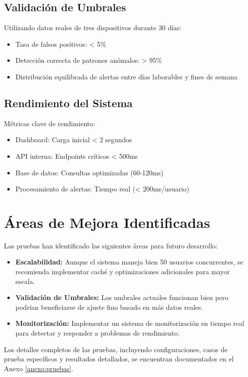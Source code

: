 \subsection{Validación de Umbrales}
Utilizando datos reales de tres dispositivos durante 30 días:
\begin{itemize}
    \item Tasa de falsos positivos: < 5\%
    \item Detección correcta de patrones anómalos: > 95\%
    \item Distribución equilibrada de alertas entre días laborables y fines de semana
\end{itemize}

\subsection{Rendimiento del Sistema}
Métricas clave de rendimiento:
\begin{itemize}
    \item Dashboard: Carga inicial < 2 segundos
    \item API interna: Endpoints críticos < 500ms
    \item Base de datos: Consultas optimizadas (60-120ms)
    \item Procesamiento de alertas: Tiempo real (< 200ms/usuario)
\end{itemize}

\section{Áreas de Mejora Identificadas}
\label{sec:areas_mejora}

Las pruebas han identificado las siguientes áreas para futuro desarrollo:

\begin{itemize}
    \item \textbf{Escalabilidad:} Aunque el sistema maneja bien 50 usuarios concurrentes, se recomienda implementar caché y optimizaciones adicionales para mayor escala.
    \item \textbf{Validación de Umbrales:} Los umbrales actuales funcionan bien pero podrían beneficiarse de ajuste fino basado en más datos reales.
    \item \textbf{Monitorización:} Implementar un sistema de monitorización en tiempo real para detectar y responder a problemas de rendimiento.
\end{itemize}

Los detalles completos de las pruebas, incluyendo configuraciones, casos de prueba específicos y resultados detallados, se encuentran documentados en el Anexo \ref{anexo:pruebas}.


